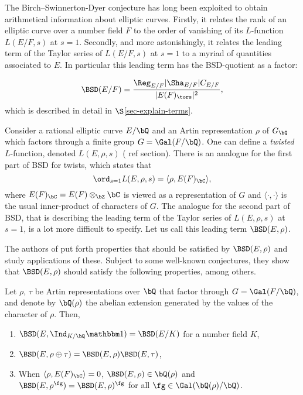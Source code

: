 The Birch--Swinnerton-Dyer conjecture has long been exploited to obtain arithmetical information about elliptic curves. Firstly, it relates the rank of an elliptic curve over a number field $F$ to the order of vanishing of its $L$-function $L(E / F, s)$ at $s = 1$. Secondly, and more astonishingly, it relates the leading term of the Taylor series of $L(E / F, s)$ at $s = 1$ to a myriad of quantities associated to $E$. In particular this leading term has the BSD-quotient as a factor:

\[
 \BSD(E / F) = \frac{\Reg_{E/F}|\Sha_{E/F}|C_{E/F}}{|E(F)_{\tors}|^2},
\]
which is described in detail in $\S$\ref{sec-explain-terms}.

Consider a rational elliptic curve $E / \bQ$ and an Artin representation $\rho$ of $G_{\bQ}$ which factors through a finite group $G = \Gal(F / \bQ)$. One can define a \textit{twisted} $L$-function, denoted $L(E, \rho, s)$ ({\color{red} ref section}). There is an analogue for the first part of BSD for twists, which states that 
\[ \ord_{s = 1} L(E, \rho, s) = \langle \rho, E(F)_{\bC} \rangle, \]
where $E(F)_{\bC} = E(F) \otimes_{\bZ} \bC$ is viewed as a representation of $G$ and $\langle \cdot , \cdot \rangle$ is the usual inner-product of characters of $G$. The analogue for the second part of BSD, that is describing the leading term of the Taylor series of $L(E, \rho, s)$ at $s = 1$, is a lot more difficult to specify. Let us call this leading term $\BSD(E, \rho)$.

The authors of \cite{DEW1} put forth properties that should be satisfied by $\BSD(E, \rho)$ and study applications of these. Subject to some well-known conjectures, they show that $\BSD(E, \rho)$ should satisfy the following properties, among others.

\begin{conj*}[ = Conjecture \ref{conj_4}, {\cite[Conjecture 4]{DEW1}})]\label{intro-conj_4}
    Let $\rho$, $\tau$ be Artin representations over $\bQ$ that factor through $G = \Gal(F / \bQ)$, and denote by $\bQ(\rho)$ the abelian extension generated by the values of the character of $\rho$. Then,
\begin{enumerate}
    \setlength\itemsep{0em}
    \item $\BSD(E, \Ind_{K / \bQ} \trivial) = \BSD(E / K)$ for a number field $K$,
    \item $\BSD(E, \rho \oplus \tau ) = \BSD(E, \rho)\BSD(E, \tau)$,
    \item When $\langle \rho, E(F)_{\bC} \rangle = 0$, $\BSD(E, \rho) \in \bQ(\rho)$ and $\BSD(E, \rho^{\fg}) = \BSD(E, \rho)^{\fg}$ for all $\fg \in \Gal(\bQ(\rho) / \bQ)$. 
\end{enumerate}
\end{conj*}

